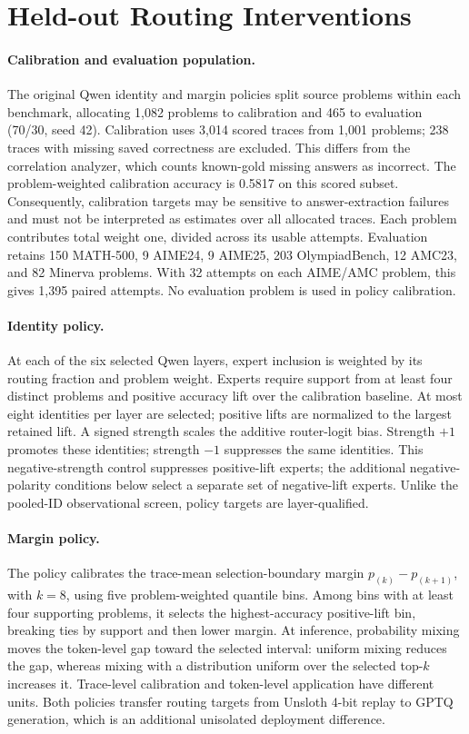 \section{Held-out Routing Interventions}
\label{sec:guiding}

\paragraph{Calibration and evaluation population.}
The original Qwen identity and margin policies split source problems within
each benchmark, allocating 1,082
problems to calibration and 465 to evaluation (70/30, seed 42).
Calibration uses 3,014 scored traces from 1,001 problems; 238 traces with
missing saved correctness are excluded. This differs from the correlation
analyzer, which counts known-gold missing answers as incorrect. The
problem-weighted calibration accuracy is 0.5817 on this scored subset.
Consequently, calibration targets may be sensitive to answer-extraction
failures and must not be interpreted as estimates over all allocated traces.
Each problem contributes total weight one, divided across its usable attempts.
Evaluation retains 150 MATH-500, 9 AIME24, 9 AIME25, 203 OlympiadBench,
12 AMC23, and 82 Minerva problems. With 32 attempts on each AIME/AMC
problem, this gives 1,395 paired attempts. No evaluation problem is used
in policy calibration.

\paragraph{Identity policy.}
At each of the six selected Qwen layers, expert inclusion is weighted by
its routing fraction and problem weight. Experts require support from at
least four distinct problems and positive accuracy lift over the calibration
baseline. At most eight identities per layer are selected; positive lifts
are normalized to the largest retained lift. A signed strength scales the
additive router-logit bias. Strength $+1$ promotes these identities;
strength $-1$ suppresses the same identities. This negative-strength control suppresses positive-lift experts; the additional
negative-polarity conditions below select a separate set of negative-lift experts. Unlike the
pooled-ID observational screen, policy targets are layer-qualified.

\paragraph{Margin policy.}
The policy calibrates the trace-mean selection-boundary margin
$p_{(k)}-p_{(k+1)}$, with $k=8$, using five problem-weighted quantile bins.
Among bins with at least four supporting problems, it selects the
highest-accuracy positive-lift bin, breaking ties by support and then lower
margin. At inference, probability mixing moves the token-level gap toward
the selected interval: uniform mixing reduces the gap, whereas mixing with
a distribution uniform over the selected top-$k$ increases it.
Trace-level calibration and token-level application have different units.
Both policies transfer routing targets from Unsloth 4-bit replay to GPTQ
generation, which is an additional unisolated deployment difference.

